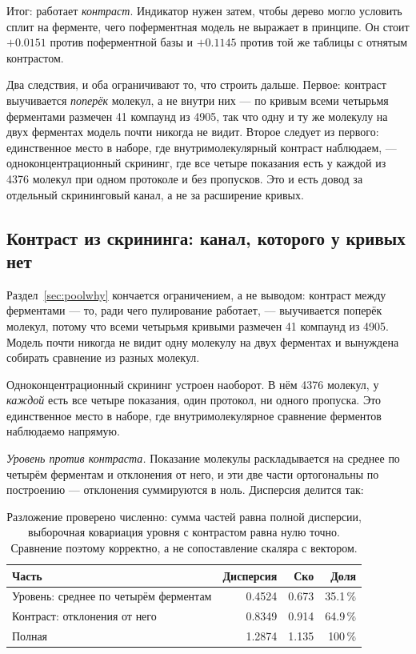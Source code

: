 Итог: работает \emph{контраст}. Индикатор нужен затем, чтобы дерево могло условить сплит на
ферменте, чего поферментная модель не выражает в принципе. Он стоит $+0.0151$ против
поферментной базы и $+0.1145$ против той же таблицы с отнятым контрастом.

Два следствия, и оба ограничивают то, что строить дальше. Первое: контраст выучивается
\emph{поперёк} молекул, а не внутри них --- по кривым всеми четырьмя ферментами размечен
41 компаунд из 4905, так что одну и ту же молекулу на двух ферментах модель почти никогда не
видит. Второе следует из первого: единственное место в наборе, где внутримолекулярный контраст
наблюдаем, --- одноконцентрационный скрининг, где все четыре показания есть у каждой из 4376
молекул при одном протоколе и без пропусков. Это и есть довод за отдельный скрининговый канал,
а не за расширение кривых.


\subsection{Контраст из скрининга: канал, которого у кривых нет}
\label{sec:contrast}

Раздел~\ref{sec:poolwhy} кончается ограничением, а не выводом: контраст между ферментами ---
то, ради чего пулирование работает, --- выучивается поперёк молекул, потому что всеми четырьмя
кривыми размечен 41 компаунд из 4905. Модель почти никогда не видит одну молекулу на двух
ферментах и вынуждена собирать сравнение из разных молекул.

Одноконцентрационный скрининг устроен наоборот. В нём 4376 молекул, у \emph{каждой} есть все
четыре показания, один протокол, ни одного пропуска. Это единственное место в наборе, где
внутримолекулярное сравнение ферментов наблюдаемо напрямую.

\emph{Уровень против контраста.} Показание молекулы раскладывается на среднее по четырём
ферментам и отклонения от него, и эти две части ортогональны по построению --- отклонения
суммируются в ноль. Дисперсия делится так:

\begin{table}[htbp]\centering\small
\begin{tabularx}{0.78\textwidth}{@{}Xrrr@{}}
\toprule
Часть & Дисперсия & Ско & Доля \\
\midrule
Уровень: среднее по четырём ферментам & 0.4524 & 0.673 & 35.1\,\% \\
Контраст: отклонения от него          & 0.8349 & 0.914 & 64.9\,\% \\
\midrule
Полная                                & 1.2874 & 1.135 & 100\,\% \\
\bottomrule
\end{tabularx}
\caption{Разложение проверено численно: сумма частей равна полной дисперсии, выборочная
ковариация уровня с контрастом равна нулю точно. Сравнение поэтому корректно, а не
сопоставление скаляра с вектором.}
\label{tab:lvlcon}
\end{table}

